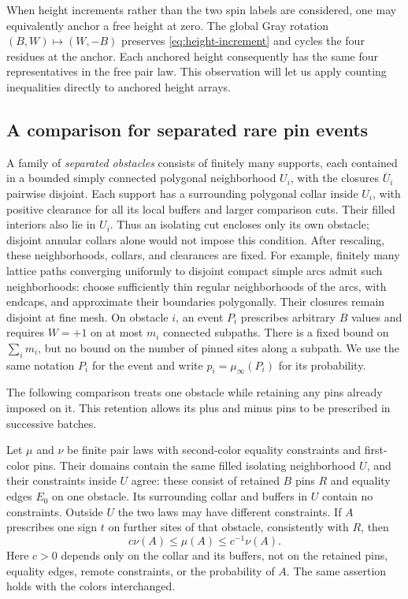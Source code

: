 When height increments rather than the two spin labels are considered,
one may equivalently anchor a free height at zero.  The global Gray
rotation $(B,W)\mapsto(W,-B)$ preserves \eqref{eq:height-increment} and
cycles the four residues at the anchor.  Each anchored height consequently
has the same four representatives in the free pair law.  This observation
will let us apply counting inequalities directly to anchored height arrays.

\subsection{A comparison for separated rare pin events}

A family of \emph{separated obstacles} consists of finitely many supports,
each contained in a bounded simply connected polygonal neighborhood $U_i$,
with the closures $\overline U_i$ pairwise disjoint.  Each support has a
surrounding polygonal collar inside $U_i$, with positive clearance for all
its local buffers and larger comparison cuts.  Their filled interiors
also lie in $U_i$.  Thus an isolating cut encloses only its own obstacle;
disjoint annular collars alone would not impose this condition.
After rescaling, these neighborhoods, collars, and clearances are fixed.
For example, finitely many lattice paths converging uniformly to disjoint
compact simple arcs admit such neighborhoods: choose sufficiently thin
regular neighborhoods of the arcs, with endcaps, and approximate their
boundaries polygonally.  Their closures remain disjoint at fine mesh.  On obstacle $i$, an event $P_i$ prescribes arbitrary
$B$ values and requires $W=+1$ on at most $m_i$ connected subpaths.  There
is a fixed bound on $\sum_i m_i$, but no bound on the number of pinned
sites along a subpath.  We use the same notation $P_i$ for the event and
write $p_i=\mu_\infty(P_i)$ for its probability.

The following comparison treats one obstacle while retaining any pins
already imposed on it.  This retention allows its plus and minus pins to
be prescribed in successive batches.

\begin{lemma}
\label{lem:relative-pin-comparison}
Let $\mu$ and $\nu$ be finite pair laws with second-color equality
constraints and first-color pins.  Their domains contain the same filled
isolating neighborhood $U$, and their constraints inside $U$ agree:
these consist of retained $B$ pins $R$ and equality edges $E_0$ on one
obstacle.  Its surrounding collar and buffers in $U$ contain no
constraints.  Outside $U$ the two laws may have different constraints.
If $A$ prescribes one sign $t$ on further sites of that obstacle,
consistently with $R$, then
\[
 c\nu(A)\leq\mu(A)\leq c^{-1}\nu(A).
\]
Here $c>0$ depends only on the collar and its buffers, not on the
retained pins, equality edges, remote constraints, or the probability
of $A$.  The same assertion holds with the colors interchanged.
\end{lemma}

